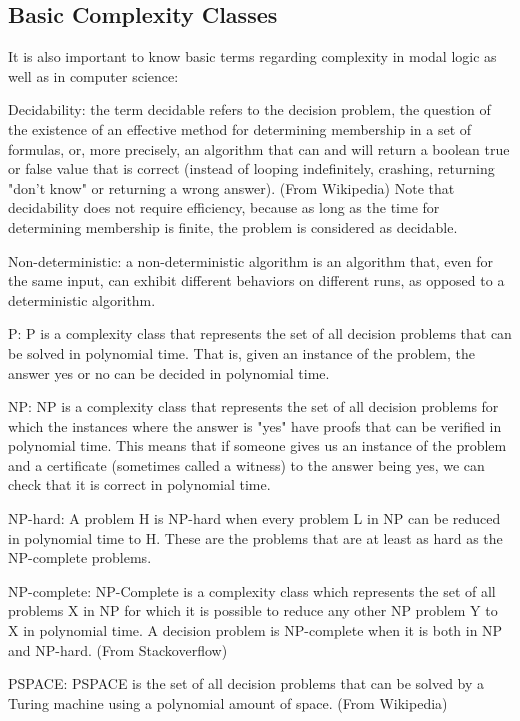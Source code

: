 \documentclass{article}
\begin{document}
\subsection{Basic Complexity Classes}
\par It is also important to know basic terms regarding complexity in modal logic as well as in computer science: \\
\par Decidability: the term decidable refers to the decision problem, the question of the existence of an effective method for determining membership in a set of formulas, or, more precisely, an algorithm that can and will return a boolean true or false value that is correct (instead of looping indefinitely, crashing, returning "don't know" or returning a wrong answer). (From Wikipedia) Note that decidability does not require efficiency, because as long as the time for determining membership is finite, the problem is considered as decidable. 
\par Non-deterministic: a non-deterministic algorithm is an algorithm that, even for the same input, can exhibit different behaviors on different runs, as opposed to a deterministic algorithm.
\par P: P is a complexity class that represents the set of all decision problems that can be solved in polynomial time. That is, given an instance of the problem, the answer yes or no can be decided in polynomial time. 
\par NP: NP is a complexity class that represents the set of all decision problems for which the instances where the answer is "yes" have proofs that can be verified in polynomial time. This means that if someone gives us an instance of the problem and a certificate (sometimes called a witness) to the answer being yes, we can check that it is correct in polynomial time.
\par NP-hard: A problem H is NP-hard when every problem L in NP can be reduced in polynomial time to H. These are the problems that are at least as hard as the NP-complete problems.
\par NP-complete: NP-Complete is a complexity class which represents the set of all problems X in NP for which it is possible to reduce any other NP problem Y to X in polynomial time. A decision problem is NP-complete when it is both in NP and NP-hard. (From Stackoverflow)
\par PSPACE: PSPACE is the set of all decision problems that can be solved by a Turing machine using a polynomial amount of space. (From Wikipedia) 
\end{document}
